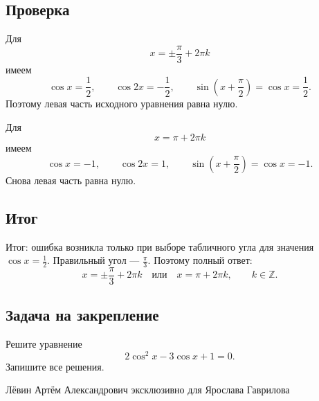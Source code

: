 \documentclass[12pt,a4paper]{article}
\newcommand{\resultlabel}[1]{\textcolor{teal!60!black}{Итог:} #1}
\begin{document}
\subsection*{Проверка}
Для
\[
x=\pm\frac{\pi}{3}+2\pi k
\]
имеем
\[
\cos x=\frac12,
\qquad
\cos 2x=-\frac12,
\qquad
\sin\left(x+\frac{\pi}{2}\right)=\cos x=\frac12.
\]
Поэтому левая часть исходного уравнения равна нулю.

Для
\[
x=\pi+2\pi k
\]
имеем
\[
\cos x=-1,
\qquad
\cos 2x=1,
\qquad
\sin\left(x+\frac{\pi}{2}\right)=\cos x=-1.
\]
Снова левая часть равна нулю.

\subsection*{Итог}
\resultlabel{ошибка возникла только при выборе табличного угла для значения $\cos x=\frac12$. Правильный угол --- $\frac{\pi}{3}$. Поэтому полный ответ:}
\[
\boxed{x=\pm\frac{\pi}{3}+2\pi k
\quad\text{или}\quad
x=\pi+2\pi k,
\qquad k\in\mathbb Z.}
\]

\subsection*{Задача на закрепление}
Решите уравнение
\[
2\cos^2x-3\cos x+1=0.
\]
Запишите все решения.

\vfill
\begin{center}
\small Лёвин Артём Александрович эксклюзивно для Ярослава Гаврилова
\end{center}
\end{document}
